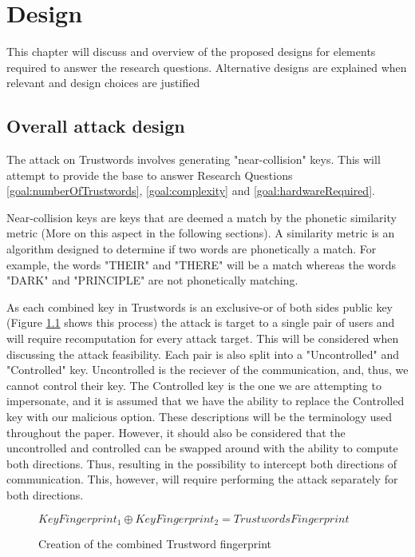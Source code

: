 \chapter{Design}
\label{cha:Design}

This chapter will discuss and overview of the proposed designs for elements required to answer the research questions. Alternative designs are explained when relevant and design choices are justified

\section{Overall attack design}

The attack on Trustwords involves generating "near-collision" keys. 
This will attempt to provide the base to answer Research Questions \ref{goal:numberOfTrustwords}, \ref{goal:complexity} and \ref{goal:hardwareRequired}.

Near-collision keys are keys that are deemed a match by the phonetic similarity metric (More on this aspect in the following sections). A similarity metric is an algorithm designed to determine if two words are phonetically a match. For example, the words "THEIR" and "THERE" will be a match whereas the words "DARK" and "PRINCIPLE" are not phonetically matching.

As each combined key in Trustwords is an exclusive-or of both sides public key (Figure \ref{fig:xor_trustwords} shows this process) the attack is target to a single pair of users and will require recomputation for every attack target. This will be considered when discussing the attack feasibility. Each pair is also split into a "Uncontrolled" and "Controlled" key. Uncontrolled is the reciever of the communication, and, thus, we cannot control their key. The Controlled key is the one we are attempting to impersonate, and it is assumed that we have the ability to replace the Controlled key with our malicious option. These descriptions will be the terminology used throughout the paper. However, it should also be considered that the uncontrolled and controlled can be swapped around with the ability to compute both directions. Thus, resulting in the possibility to intercept both directions of communication. This, however, will require performing the attack separately for both directions.

\begin{figure}[h!]
    \centering
    $KeyFingerprint_{1} \oplus KeyFingerprint_{2} = TrustwordsFingerprint$
    \caption{Creation of the combined Trustword fingerprint}
    \label{fig:xor_trustwords}
\end{figure}

